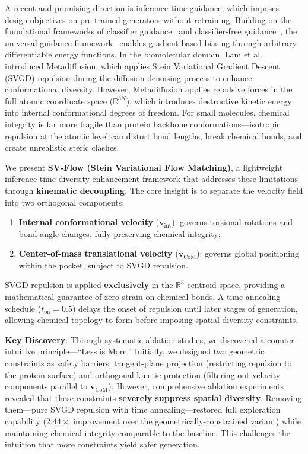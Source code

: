 \documentclass[a4paper,11pt]{article}
\begin{document}
A recent and promising direction is inference-time guidance, which imposes design
objectives on pre-trained generators without retraining.  Building on the
foundational frameworks of classifier guidance~\cite{dhariwal2021} and
classifier-free guidance~\cite{ho2022cfg}, the universal guidance
framework~\cite{bansal2023} enables gradient-based biasing through arbitrary
differentiable energy functions.  In the biomolecular domain, Lam et
al.~\cite{lam2026metadiffusion} introduced Metadiffusion, which applies Stein
Variational Gradient Descent (SVGD) repulsion during the diffusion denoising
process to enhance conformational diversity.  However, Metadiffusion applies
repulsive forces in the full atomic coordinate space ($\mathbb{R}^{3N}$), which
introduces destructive kinetic energy into internal conformational degrees of
freedom.  For small molecules, chemical integrity is far more fragile than
protein backbone conformations---isotropic repulsion at the atomic level can
distort bond lengths, break chemical bonds, and create unrealistic steric
clashes.

We present \textbf{SV-Flow (Stein Variational Flow Matching)}, a lightweight
inference-time diversity enhancement framework that addresses these limitations
through \textbf{kinematic decoupling}.  The core insight is to separate the
velocity field into two orthogonal components:

\begin{enumerate}
  \item \textbf{Internal conformational velocity}
    ($\mathbf{v}_{\text{int}}$): governs torsional rotations and bond-angle
    changes, fully preserving chemical integrity;
  \item \textbf{Center-of-mass translational velocity}
    ($\mathbf{v}_{\text{CoM}}$): governs global positioning within the pocket,
    subject to SVGD repulsion.
\end{enumerate}

SVGD repulsion is applied \textbf{exclusively} in the $\mathbb{R}^3$ centroid
space, providing a mathematical guarantee of zero strain on chemical bonds.  A
time-annealing schedule ($t_{\text{on}}=0.5$) delays the onset of repulsion until
later stages of generation, allowing chemical topology to form before imposing
spatial diversity constraints.

\textbf{Key Discovery}: Through systematic ablation studies, we discovered a
counter-intuitive principle---``Less is More.''  Initially, we designed two
geometric constraints as safety barriers: tangent-plane projection (restricting
repulsion to the protein surface) and orthogonal kinetic protection (filtering
out velocity components parallel to $\mathbf{v}_{\text{CoM}}$).  However,
comprehensive ablation experiments revealed that these constraints
\textbf{severely suppress spatial diversity}.  Removing them---pure SVGD
repulsion with time annealing---restored full exploration capability
($2.44\times$ improvement over the geometrically-constrained variant) while
maintaining chemical integrity comparable to the baseline.  This challenges the
intuition that more constraints yield safer generation.
\end{document}

